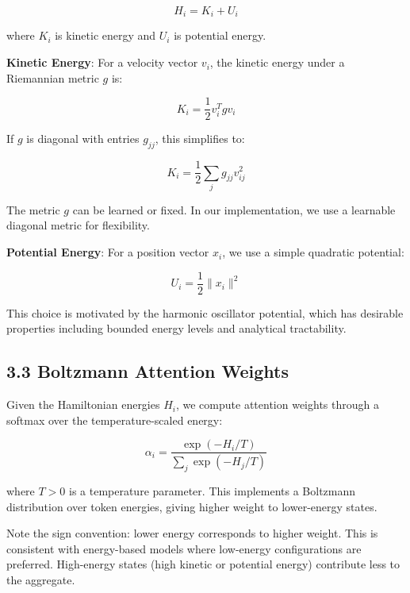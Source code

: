 \documentclass[12pt]{article}
\begin{document}
\begin{equation}
H_i = K_i + U_i
\end{equation}

where $K_i$ is kinetic energy and $U_i$ is potential energy.

\textbf{Kinetic Energy}: For a velocity vector $v_i$, the kinetic energy under a Riemannian metric $g$ is:

\begin{equation}
K_i = \frac{1}{2} v_i^T g v_i
\end{equation}

If $g$ is diagonal with entries $g_{jj}$, this simplifies to:

\begin{equation}
K_i = \frac{1}{2} \sum_j g_{jj} v_{ij}^2
\end{equation}

The metric $g$ can be learned or fixed. In our implementation, we use a learnable diagonal metric for flexibility.

\textbf{Potential Energy}: For a position vector $x_i$, we use a simple quadratic potential:

\begin{equation}
U_i = \frac{1}{2} \|x_i\|^2
\end{equation}

This choice is motivated by the harmonic oscillator potential, which has desirable properties including bounded energy levels and analytical tractability.

\subsection{3.3 Boltzmann Attention Weights}

Given the Hamiltonian energies $H_i$, we compute attention weights through a softmax over the temperature-scaled energy:

\begin{equation}
\alpha_i = \frac{\exp(-H_i / T)}{\sum_j \exp(-H_j / T)}
\end{equation}

where $T > 0$ is a temperature parameter. This implements a Boltzmann distribution over token energies, giving higher weight to lower-energy states.

Note the sign convention: lower energy corresponds to higher weight. This is consistent with energy-based models where low-energy configurations are preferred. High-energy states (high kinetic or potential energy) contribute less to the aggregate.
\end{document}
